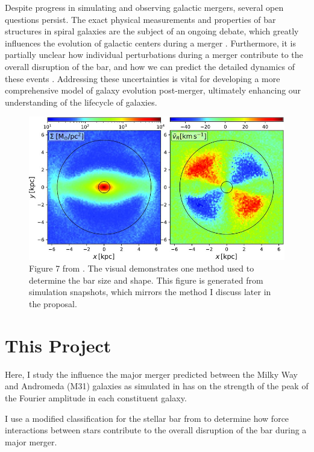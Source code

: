 \documentclass[twocolumn]{aastex631}
\begin{document}
Despite progress in simulating and observing galactic mergers, several
open questions persist. The exact physical measurements and
properties of bar structures in spiral galaxies are the subject of an
ongoing debate, which greatly influences the evolution of galactic
centers during a merger \citep{rathore:25}. Furthermore, it is partially unclear
how individual perturbations during a merger contribute to the overall
disruption of the bar, and how we can predict the detailed dynamics of
these events \citep{berentzen:03}. Addressing these uncertainties is vital for
developing a more comprehensive model of galaxy evolution post-merger,
ultimately enhancing our understanding of the lifecycle of galaxies.

\begin{figure}[htbp]
  \centering
  \includegraphics[width=\columnwidth]{dehnen23.jpeg}
  \caption{Figure 7 from \citet{dehnen:23}. The visual demonstrates
    one method used to determine the bar size and shape. This figure
    is generated from simulation snapshots, which mirrors the method I
    discuss later in the proposal.}
  \label{fig:dehnen}
\end{figure}

\section{This Project}

Here, I study the influence the major merger predicted between the
Milky Way and Andromeda (M31) galaxies as simulated in
\citet{vandermarel:12} has on the strength of the peak of the Fourier
amplitude in each constituent galaxy.

I use a modified classification for the stellar bar from
\citet{dehnen:23} to determine how force interactions between stars
contribute to the overall disruption of the bar during a major merger.
\end{document}

